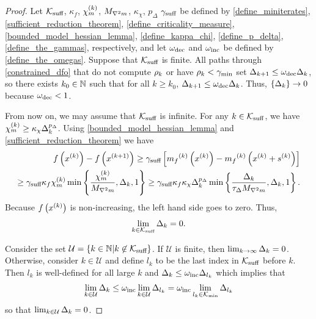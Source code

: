 \begin{proof}

Let
${\mathcal K_{\textrm{suff}}}$, $\kappa_f$, ${\chi_m^{(k)}}$, ${M_{\nabla^2 m}}$, $\kappa_{\chi}$, $p_{\Delta}$ $\gamma_{\textrm{suff}}$
be defined by
\cref{define_miniterates}, \cref{sufficient_reduction_theorem}, \cref{define_criticality_measure}, \cref{bounded_model_hessian_lemma}, \cref{define_kappa_chi}, \cref{define_p_delta}, \cref{define_the_gammas},
respectively,
and let $\omega_{\text{dec}}$ and $\omega_{\text{inc}}$ be defined by \cref{define_the_omegas}.
Suppose that ${\mathcal K_{\textrm{suff}}}$ is finite.
All paths through \cref{constrained_dfo} that do not compute $\rho_k$ or have $\rho_k < \gamma_{\textrm{min}}$ 
set $\Delta_{k+1} \le \omega_{\text{dec}} \Delta_k$, so there exists $k_0 \in \mathbb N$ such that for all $k \ge  k_0$, $\Delta_{k+1} \le \omega_{\text{dec}} \Delta_k$.
Thus, $\left\{\Delta_k\right\} \to 0$ because $\omega_{\text{dec}} < 1$.



From now on, we may assume that ${\mathcal K_{\textrm{suff}}}$ is infinite.  
For any $k \in {\mathcal K_{\textrm{suff}}}$, we have ${\chi_m^{(k)}} \ge \kappa_{\chi}\Delta_k^{p_{\Delta}}$.
Using \cref{bounded_model_hessian_lemma} and \cref{sufficient_reduction_theorem} we have
\begin{align*}
f\left(x^{(k)}\right) - f\left({{x}^{(k+1)}}\right) \ge \gamma_{\textrm{suff}} \left[{{m}_f}^{(k)}\left(x^{(k)}\right) - {{m}_f}^{(k)}\left(x^{(k)} + {{s}^{(k)}}\right)\right] \\
\ge \gamma_{\textrm{suff}} \kappa_f {\chi_m^{(k)}} \min\left\{\frac{{\chi_m^{(k)}}}{{M_{\nabla^2 m}}}, \Delta_k, 1\right\}
\ge \gamma_{\textrm{suff}} \kappa_f \kappa_{\chi}\Delta_k^{p_{\Delta}}\min\left\{\frac{\Delta_k}{\tau_{\Delta} {M_{\nabla^2 m}}}, \Delta_k, 1\right\}.
\end{align*}
% 
Because $f\left(x^{(k)}\right)$ is non-increasing, the left hand side goes to zero.
Thus,
\begin{align}
\lim_{k \in {\mathcal K_{\textrm{suff}}}} \Delta_k = 0.
\end{align}

Consider the set
$\mathcal U = \{ k \in \mathbb N | k \not \in {\mathcal K_{\textrm{suff}}} \}$.
If $\mathcal U$ is finite, then $\lim_{k\to\infty}\Delta_k = 0$.
Otherwise, consider $k \in \mathcal U$ and define $l_k$ to be the last index in ${\mathcal K_{\textrm{suff}}}$ before $k$.
Then $l_k$ is well-defined for all large $k$  and $\Delta_k \le \omega_{\text{inc}} \Delta_{l_k}$ which implies that
\begin{align}
\lim_{k \in \mathcal U } \Delta_k \le \omega_{\text{inc}} \lim_{k \in \mathcal U} \Delta_{l_k} = \omega_{\text{inc}} \lim_{l_k \in {\mathcal K_{\textrm{min}}}} \Delta_{l_k}
\end{align}
so that $\lim_{k \in \mathcal U} \Delta_k = 0$.
\end{proof}


